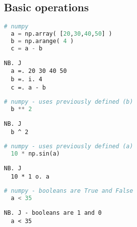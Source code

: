 \subsection*{Basic operations}

\begin{lstlisting}[language=python, frame=single, framerule=0pt, basicstyle=\ttfamily\normalsize, keywordstyle=\bfseries\color{keywcolor}\normalsize]
  # numpy 
  a = np.array( [20,30,40,50] ) 
  b = np.arange( 4 ) 
  c = a - b  
\end{lstlisting}

\begin{lstlisting}[language=jdoc, frame=single, framerule=0pt, basicstyle=\ttfamily\normalsize, keywordstyle=\bfseries\color{keywcolor}\normalsize]   
  NB. J 
  a =. 20 30 40 50 
  b =. i. 4 
  c =. a - b  
\end{lstlisting}

\begin{lstlisting}[language=python, frame=single, framerule=0pt, basicstyle=\ttfamily\normalsize, keywordstyle=\bfseries\color{keywcolor}\normalsize] 
  # numpy - uses previously defined (b) 
  b ** 2  
\end{lstlisting}

\begin{lstlisting}[language=jdoc, frame=single, framerule=0pt, basicstyle=\ttfamily\normalsize, keywordstyle=\bfseries\color{keywcolor}\normalsize]  
  NB. J 
  b ^ 2
\end{lstlisting}

\begin{lstlisting}[language=python, frame=single, framerule=0pt, basicstyle=\ttfamily\normalsize, keywordstyle=\bfseries\color{keywcolor}\normalsize]
  # numpy - uses previously defined (a) 
  10 * np.sin(a)  
\end{lstlisting}

\begin{lstlisting}[language=jdoc, frame=single, framerule=0pt, basicstyle=\ttfamily\normalsize, keywordstyle=\bfseries\color{keywcolor}\normalsize]  
  NB. J 
  10 * 1 o. a  
\end{lstlisting}
  
\begin{lstlisting}[language=python, frame=single, framerule=0pt, basicstyle=\ttfamily\normalsize, keywordstyle=\bfseries\color{keywcolor}\normalsize]
  # numpy - booleans are True and False 
  a < 35  
\end{lstlisting}

\begin{lstlisting}[language=jdoc, frame=single, framerule=0pt, basicstyle=\ttfamily\normalsize, keywordstyle=\bfseries\color{keywcolor}\normalsize] 
  NB. J - booleans are 1 and 0 
  a < 35
\end{lstlisting}

